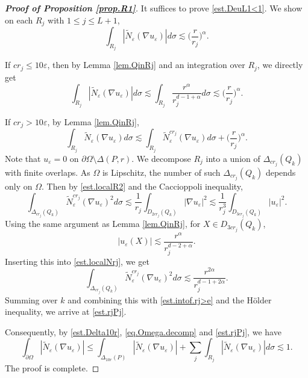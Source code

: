 \documentclass[reqno,12pt]{amsart} %
\theoremstyle{definition}
\theoremstyle{remark}
\numberwithin{equation}{section}
\newcommand{\e}{\varepsilon}
\begin{document}
\begin{proof}[\textbf{Proof of Proposition \ref{prop.R1}}]
    It suffices to prove \eqref{est.DeuL1<1}.
    We show on each $R_j$ with $1\le j\le L+1$,
    \begin{equation}\label{est.rjPj}
        \int_{R_j} |\widetilde{N}_\e(\nabla u_\e)| d\sigma \lesssim  \Big( \frac{r}{r_j} \Big)^\alpha.
    \end{equation}    
    
    If $c r_j \le 10 \e$, then by Lemma \ref{lem.QinRj} and an integration over $R_j$, we directly get
    \begin{equation}
        \int_{R_j} |\widetilde{N}_\e(\nabla u_\e)| d\sigma \lesssim \int_{R_j } \frac{ r^\alpha}{ r_j^{d-1+\alpha}} d\sigma \lesssim \Big( \frac{r}{r_j} \Big)^\alpha.
    \end{equation}

    If $c r_j > 10\e$, by Lemma \ref{lem.QinRj},
    \begin{equation}\label{est.intof.rj>e}
        \int_{R_j} \widetilde{N}_\e(\nabla u_\e) d\sigma \lesssim \int_{R_j} \widetilde{N}_\e^{c r_j}(\nabla u_\e) d\sigma + \Big( \frac{r}{r_j} \Big)^\alpha.
    \end{equation}
    Note that $u_\e = 0$ on $\partial\Omega \setminus \Delta (P, r)$. We decompose $R_j$ into a union of $\Delta_{cr_j}(Q_k)$ with finite overlaps. As $\Omega$ is Lipschitz, the number of such $\Delta_{cr_j}(Q_k)$ depends only on $\Omega$. Then by \eqref{est.localR2} and the Caccioppoli inequality,
    \begin{equation}\label{est.localNrj}
        \int_{\Delta_{cr_j}(Q_k)} \widetilde{N}_\e^{cr_j}(\nabla u_\e)^2 d\sigma \lesssim \frac{1}{r_j} \int_{D_{2c r_j}(Q_k)} |\nabla u_\e|^2 \lesssim \frac{1}{r_j^3} \int_{D_{3c r_j}(Q_k)} |u_\e|^2.
    \end{equation}
    Using the same argument as Lemma \ref{lem.QinRj}, for $X\in D_{3cr_j}(Q_k)$,
    \begin{equation}\label{est.ptwise.uY1}
        |u_\e(X)| \lesssim \frac{r^\alpha}{r_j^{d-2+\alpha}}.
    \end{equation}
    Inserting this into \eqref{est.localNrj}, we get
    \begin{equation}
        \int_{\Delta_{cr_j}(Q_k)} \widetilde{N}_\e^{cr_j}(\nabla u_\e)^2 d\sigma \lesssim \frac{r^{2\alpha}}{r_j^{d-1+2\alpha}}.
    \end{equation}
    Summing over $k$ and combining this with \eqref{est.intof.rj>e} and the H\"{o}lder inequality, we arrive at \eqref{est.rjPj}.

    Consequently, by \eqref{est.Delta10r}, \eqref{eq.Omega.decomp} and \eqref{est.rjPj}, we have
    \begin{equation}
        \int_{\partial \Omega} |\widetilde{N}_\e(\nabla u_\e)| \le \int_{\Delta_{10r}(P)}|\widetilde{N}_\e(\nabla u_\e)| + \sum_{j}  \int_{R_j} |\widetilde{N}_\e(\nabla u_\e)| d\sigma \lesssim 1.
    \end{equation}
    The proof is complete.
\end{proof}
\end{document}
